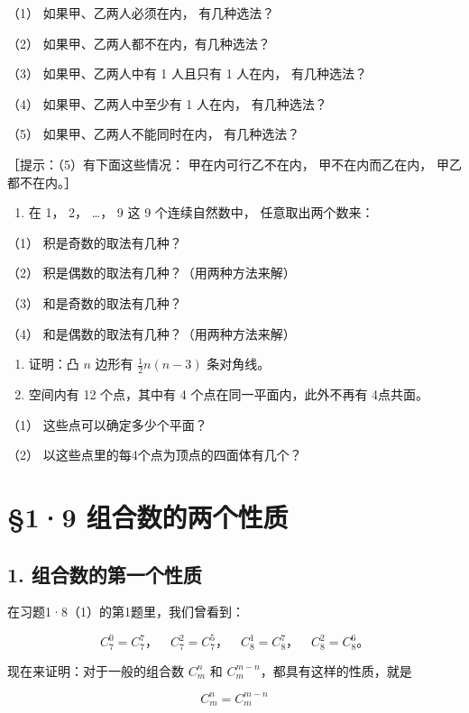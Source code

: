 （1） 如果甲、乙两人必须在内， 有几种选法？

（2） 如果甲、乙两人都不在内，有几种选法？

（3） 如果甲、乙两人中有 1 人且只有 1 人在内， 有几种选法？

（4） 如果甲、乙两人中至少有 1 人在内， 有几种选法？

（5） 如果甲、乙两人不能同时在内， 有几种选法？

［提示：（5）有下面这些情况： 甲在内可行乙不在内， 甲不在内而乙在内，
甲乙都不在内。］

\begin{enumerate}[start=2]
\item
  在 1， 2， \ldots， 9 这 9 个连续自然数中， 任意取出两个数来：
\end{enumerate}

（1） 积是奇数的取法有几种？

（2） 积是偶数的取法有几种？（用两种方法来解）

（3） 和是奇数的取法有几种？

（4） 和是偶数的取法有几种？（用两种方法来解）

\begin{enumerate}[start=3]
\item
  证明：凸 \(n\) 边形有 \(\frac{1}{2} n(n - 3)\) 条对角线。
\item
  空间内有 12 个点，其中有 4 个点在同一平面内，此外不再有 4点共面。
\end{enumerate}

（1） 这些点可以确定多少个平面？

（2） 以这些点里的每4个点为顶点的四面体有几个？

\section{§1·9 组合数的两个性质}

\subsection{1. 组合数的第一个性质}

在习题1·8（1）的第1题里，我们曾看到：

\[
C_7^0=C_7^7\text{，}\quad C_7^2=C_7^5\text{，}\quad C_8^1=C_8^7\text{，}\quad C_8^2=C_8^6\text{。}
\]

现在来证明：对于一般的组合数 \(C_{m}^{n}\) 和
\(C_{m}^{m - n}\)，都具有这样的性质，就是

\[
\boxed{C_m^n=C_m^{m-n}}
\]

